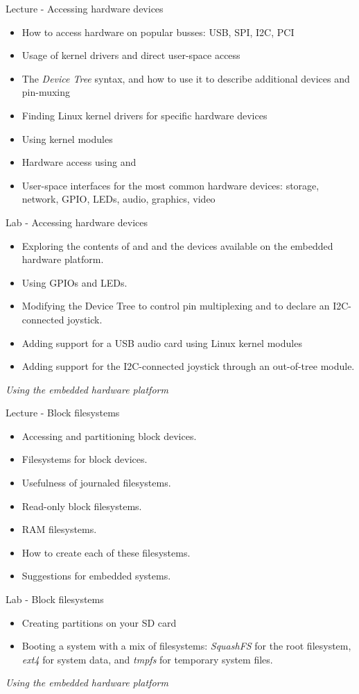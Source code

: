 \documentclass[a4paper,12pt,obeyspaces,spaces,hyphens]{article}
\begin{document}
\feagendatwocolumn
{Lecture - Accessing hardware devices}
{
  \begin{itemize}
  \item How to access hardware on popular busses: USB, SPI, I2C, PCI
  \item Usage of kernel drivers and direct user-space access
  \item The {\em Device Tree} syntax, and how to use it to describe
    additional devices and pin-muxing
  \item Finding Linux kernel drivers for specific hardware devices
  \item Using kernel modules
  \item Hardware access using  and 
  \item User-space interfaces for the most common hardware devices:
    storage, network, GPIO, LEDs, audio, graphics, video
  \end{itemize}
}
{Lab - Accessing hardware devices}
{
  \begin{itemize}
  \item Exploring the contents of  and  and the
    devices available on the embedded hardware platform.
  \item Using GPIOs and LEDs.
  \item Modifying the Device Tree to control pin multiplexing and
        to declare an I2C-connected joystick.
  \item Adding support for a USB audio card using Linux kernel modules
  \item Adding support for the I2C-connected joystick through
        an out-of-tree module.
  \end{itemize}

  \vspace{0.5cm}
  {\em Using the embedded hardware platform}
}

\feagendatwocolumn
{Lecture - Block filesystems}
{
  \begin{itemize}
  \item Accessing and partitioning block devices.
  \item Filesystems for block devices.
  \item Usefulness of journaled filesystems.
  \item Read-only block filesystems.
  \item RAM filesystems.
  \item How to create each of these filesystems.
  \item Suggestions for embedded systems.
  \end{itemize}
}
{Lab - Block filesystems}
{
  \begin{itemize}
  \item Creating partitions on your SD card
  \item Booting a system with a mix of filesystems: {\em SquashFS} for
    the root filesystem, {\em ext4} for system data, and {\em
      tmpfs} for temporary system files.
  \end{itemize}

  \vspace{0.5cm}
  {\em Using the embedded hardware platform}
}
\end{document}
